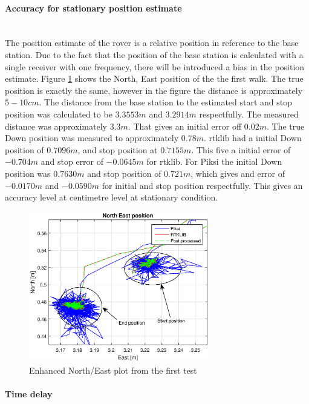 \paragraph{Accuracy for stationary position estimate}~\\

The position estimate of the rover is a relative position in reference to the base station. Due to the fact that the position of the base station is calculated with a single receiver with one frequency, there will be introduced a bias in the position estimate. Figure \ref{figure:enhancedxywalk1} shows the North, East position of the the first walk. The true position is exactly the same, however in the figure the distance is approximately $5-10cm$. The distance from the base station to the estimated start and stop position was calculated to be $3.3553m$ and $3.2914m$ respectfully. The measured distance was approximately $3.3m$. That gives an initial error off $0.02m$. The true Down position was measured to approximately $0.78m$. \gls{rtklib} had a initial Down position of $0.7096m$, and stop position at $0.7155m$. This five a initial error of $-0.704m$ and stop error of $-0.0645m$ for \gls{rtklib}. For Piksi the initial Down position was $0.7630m$ and stop position of $0.721m$, which gives and error of $-0.0170m$ and $-0.0590m$ for initial and stop position respectfully. This gives an accuracy level at centimetre level at stationary condition. 
\begin{figure}[H]
	\centering
		\includegraphics[width=0.7\textwidth]{figs/plots/enhancedxywalk1.eps}
		\caption{Enhanced North/East plot from the first test}
		\label{figure:enhancedxywalk1}
\end{figure}
\paragraph{Time delay}~\\

